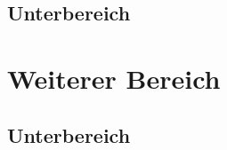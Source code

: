 \documentclass[a4paper,12pt,twoside,parskip=half,listof=totoc]{scrartcl}
\begin{document}
\lipsum[4-5]

\subsection{Unterbereich}

\lipsum[6-11]

\section{Weiterer Bereich}

\lipsum[12-20]

\subsection{Unterbereich}

\lipsum[4-8]

\listoffigures
\end{document}
